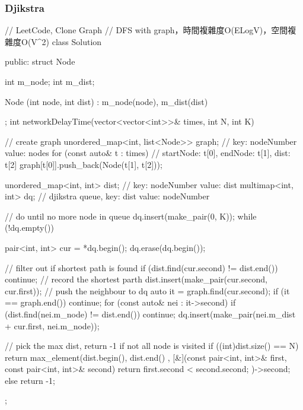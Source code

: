 \subsubsection{Djikstra}
\begin{Code}
// LeetCode, Clone Graph
// DFS with graph，時間複雜度O(ELogV)，空間複雜度O(V^2)
class Solution {
public:
    struct Node {
        int m_node;
        int m_dist;

        Node (int node, int dist)
            : m_node(node), m_dist(dist) {}
    };
    int networkDelayTime(vector<vector<int>>& times, int N, int K) {
        // create graph
        unordered_map<int, list<Node>> graph;  // key: nodeNumber value: nodes
        for (const auto& t : times) // startNode: t[0], endNode: t[1], dist: t[2]
            graph[t[0]].push_back(Node(t[1], t[2]));

        unordered_map<int, int> dist; // key: nodeNumber value: dist
        multimap<int, int> dq; // djikstra queue, key: dist value: nodeNumber

        // do until no more node in queue
        dq.insert(make_pair(0, K));
        while (!dq.empty()) {
            pair<int, int> cur = *dq.begin();
            dq.erase(dq.begin());

            // filter out if shortest path is found
            if (dist.find(cur.second) != dist.end()) continue;
            // record the shortest parth
            dist.insert(make_pair(cur.second, cur.first));
            // push the neighbour to dq
            auto it = graph.find(cur.second);
            if (it == graph.end()) continue;
            for (const auto& nei : it->second) {
                if (dist.find(nei.m_node) != dist.end()) continue;
                dq.insert(make_pair(nei.m_dist + cur.first, nei.m_node));
            }
        }

        // pick the max dist, return -1 if not all node is visited
        if ((int)dist.size() == N)
            return max_element(dist.begin(), dist.end()
                                , [&](const pair<int, int>& first, const pair<int, int>& second)
                                {
                                    return first.second < second.second;
                                })->second;
        else
            return -1;
    }
};

\end{Code}
